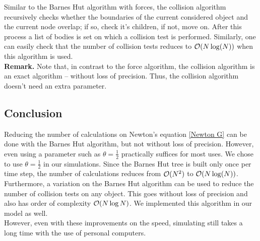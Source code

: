 Similar to the Barnes Hut algorithm with forces, the collision algorithm recursively checks whether the boundaries of the current considered object and the current node overlap; if so, check it's children, if not, move on. After this process a list of bodies is set on which a collision test is performed. Similarly, one can easily check that the number of collision tests reduces to $\mathcal{O}(N\log(N))$ when this algorithm is used.\\
\textbf{Remark.} Note that, in contrast to the force algorithm, the collision algorithm is an exact algorithm -- without loss of precision. Thus, the collision algorithm doesn't need an extra parameter.
\subsection{Conclusion}
Reducing the number of calculations on Newton's equation \ref{Newton G} can be done with the Barnes Hut algorithm, but not without loss of precision. However, even using a parameter such as $\theta=\frac{1}{2}$ practically suffices for most uses. We chose to use $\theta = \frac{1}{2}$ in our simulations. Since the Barnes Hut tree is built only once per time step, the number of calculations reduces from $\mathcal{O}(N^2)$ to $\mathcal{O}(N\log(N))$.\\
Furthermore, a variation on the Barnes Hut algorithm can be used to reduce the number of collision tests on any object. This goes without loss of precision and also has order of complexity $\mathcal{O}(N\log N)$. We implemented this algorithm in our model as well.\\
However, even with these improvements on the speed, simulating still takes a long time with the use of personal computers.

